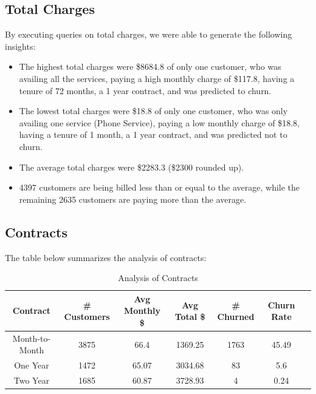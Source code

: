 \documentclass{article}
\theoremstyle{mytheoremstyle}
\theoremstyle{mytheoremstyle}
\theoremstyle{myproblemstyle}
\begin{document}
\subsection{Total Charges}
By executing queries on total charges, we were able to generate the following insights:
\begin{itemize}
    \item The highest total charges were \$8684.8 of only one customer, who was availing all the services, paying a high monthly charge of \$117.8, having a tenure of 72 months, a 1 year contract, and was predicted to churn.
    \item The lowest total charges were \$18.8 of only one customer, who was only availing one service (Phone Service), paying a low monthly charge of \$18.8, having a tenure of 1 month, a 1 year contract, and was predicted not to churn.
    \item The average total charges were \$2283.3 (\$2300 rounded up).
    \item 4397 customers are being billed less than or equal to the average, while the remaining 2635 customers are paying more than the average.
\end{itemize}

\subsection{Contracts}
The table below summarizes the analysis of contracts:
\begin{table}[H]
    \centering
    \begin{tabular}{|c|c|c|c|c|c|c|}
        \hline
        \textbf{Contract} & \textbf{\# Customers} & \textbf{Avg Monthly \$} & \textbf{Avg Total \$} & \textbf{\# Churned} & \textbf{Churn Rate} \\
        \hline
        Month-to-Month & 3875 & 66.4 & 1369.25 & 1763 & 45.49 \\
        One Year & 1472 & 65.07 & 3034.68 & 83 & 5.6 \\
        Two Year & 1685 & 60.87 & 3728.93 & 4 & 0.24 \\
        \hline
    \end{tabular}
    \caption{Analysis of Contracts}
\end{table}
\end{document}
